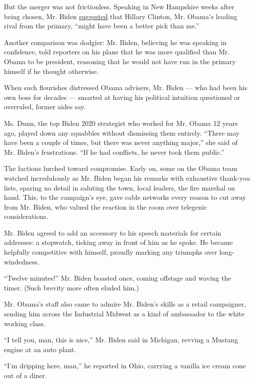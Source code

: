 But the merger was not frictionless. Speaking in New Hampshire weeks
after being chosen, Mr. Biden
\href{https://www.nytimes.com/2008/09/11/world/americas/11iht-biden.4.16081515.html}{suggested}
that Hillary Clinton, Mr. Obama's leading rival from the primary,
``might have been a better pick than me.''

Another comparison was dodgier: Mr. Biden, believing he was speaking in
confidence, told reporters on his plane that he was more qualified than
Mr. Obama to be president, reasoning that he would not have run in the
primary himself if he thought otherwise.

When such flourishes distressed Obama advisers, Mr. Biden --- who had
been his own boss for decades --- smarted at having his political
intuition questioned or overruled, former aides say.

Ms. Dunn, the top Biden 2020 strategist who worked for Mr. Obama 12
years ago, played down any squabbles without dismissing them entirely.
``There may have been a couple of times, but there was never anything
major,'' she said of Mr. Biden's frustrations. ``If he had conflicts, he
never took them public.''

The factions lurched toward compromise. Early on, some on the Obama team
watched incredulously as Mr. Biden began his remarks with exhaustive
thank-you lists, sparing no detail in saluting the town, local leaders,
the fire marshal on hand. This, to the campaign's eye, gave cable
networks every reason to cut away from Mr. Biden, who valued the
reaction in the room over telegenic considerations.

Mr. Biden agreed to add an accessory to his speech materials for certain
addresses: a stopwatch, ticking away in front of him as he spoke. He
became helpfully competitive with himself, proudly marking any triumphs
over long-windedness.

``Twelve minutes!'' Mr. Biden boasted once, coming offstage and waving
the timer. (Such brevity more often eluded him.)

Mr. Obama's staff also came to admire Mr. Biden's skills as a retail
campaigner, sending him across the Industrial Midwest as a kind of
ambassador to the white working class.

``I tell you, man, this is nice,'' Mr. Biden said in Michigan, revving a
Mustang engine at an auto plant.

``I'm dripping here, man,'' he reported in Ohio, carrying a vanilla ice
cream cone out of a diner.


